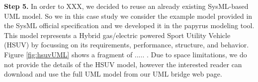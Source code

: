 \textbf{Step 5.} In order to XXX, we decided to reuse an already existing SysML-based UML model. So we in this case study we consider
 the example model provided in the SysML official specification and we developed it in the papyrus modeling tool.
This model represents a Hybrid gas/electric powered Sport Utility Vehicle (HSUV) by focussing on its requirements, performance, structure, and behavior. Figure \ref{fig:hsuvUML} shows a fragment of ..... . Due to space limitations, we do not provide the details of the HSUV model, however the interested reader can download and use the full UML model from our UML bridge web page. 

\begin{figure}
  \centering
 \hspace{10mm}

\end{figure}
